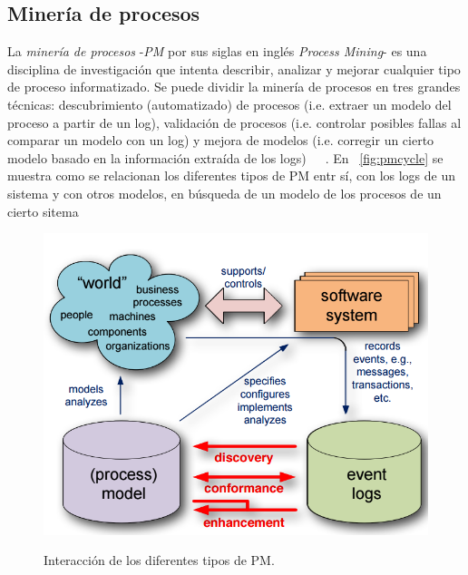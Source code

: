 
\subsection{Minería de procesos} 
\label{sec:2.process mining subsection}

La \textit{minería de procesos} -\textit{PM} por sus siglas en inglés \textit{Process Mining}-
es una disciplina de investigación que intenta describir, analizar y mejorar cualquier
tipo de proceso informatizado. Se puede dividir la minería de procesos en tres grandes técnicas: descubrimiento (automatizado)
de procesos (i.e. extraer un modelo del proceso a partir de un log), validación de procesos (i.e. controlar posibles fallas 
al comparar un modelo con un log) y mejora de modelos (i.e. corregir un cierto modelo basado en la información extraída de los logs)~\cite{Aalst2004}~\cite{AalstBook}~\cite{FahlandA15}.
En ~\autoref{fig:pmcycle} se muestra como se relacionan los diferentes tipos de PM entr sí, con los logs de un sistema
y con otros modelos, en búsqueda de un modelo de los procesos de un cierto sitema

\begin{figure}[t]
  	\centering
    \includegraphics[scale=0.5]{img/pmcycle.png}\\
    \caption{Interacción de los diferentes tipos de PM.}
    \label{fig:pmcycle}
\end{figure}

